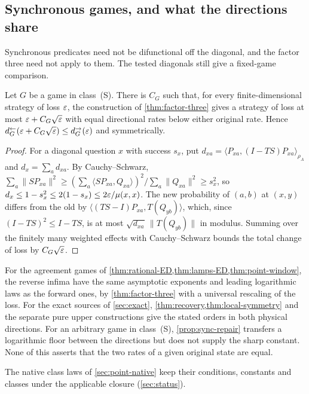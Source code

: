 \subsection{Synchronous games, and what the directions share}\label{sec:direction-sync}

Synchronous predicates need not be difunctional off the diagonal, and the factor three need not apply to them. The
tested diagonals still give a fixed-game comparison.

\begin{proposition}\label{prop:sync-repair}
Let $G$ be a game in class~(S). There is $C_G$ such that, for every finite-dimensional strategy of loss $\varepsilon$, the
construction of \cref{thm:factor-three} gives a strategy of loss at most $\varepsilon+C_G\sqrt{\varepsilon}$ with equal directional rates
below either original rate. Hence $d_G^\leftarrow(\varepsilon+C_G\sqrt{\varepsilon})\le d_G^\to(\varepsilon)$ and symmetrically.
\end{proposition}

\begin{proof}
For a diagonal question $x$ with success $s_x$, put $d_{xa}=\langle P_{xa},(I-TS)P_{xa}\rangle_{\rho_A}$ and $d_x=\sum_ad_{xa}$. By
Cauchy--Schwarz, $\sum_a\|SP_{xa}\|^2\ge(\sum_a\langle SP_{xa},Q_{xa}\rangle)^2/\sum_a\|Q_{xa}\|^2\ge s_x^2$, so
$d_x\le1-s_x^2\le2(1-s_x)\le2\varepsilon/\mu(x,x)$. The new probability of $(a,b)$ at $(x,y)$ differs from the old by
$\langle(TS-I)P_{xa},T(Q_{yb})\rangle$, which, since $(I-TS)^2\le I-TS$, is at most $\sqrt{d_{xa}}\,\|T(Q_{yb})\|$ in modulus. Summing
over the finitely many weighted effects with Cauchy--Schwarz bounds the total change of loss by $C_G\sqrt{\varepsilon}$.
\end{proof}

\begin{corollary}\label{cor:direction-spectra}
For the agreement games of \cref{thm:rational-ED,thm:lamps-ED,thm:point-window}, the reverse infima have the same
asymptotic exponents and leading logarithmic laws as the forward ones, by \cref{thm:factor-three} with a universal
rescaling of the loss. For the exact sources of \cref{sec:exact}, \cref{thm:recovery,thm:local-symmetry} and the separate
pure upper constructions give the stated orders in both physical directions. For an arbitrary game in class~(S),
\cref{prop:sync-repair} transfers a logarithmic floor between the directions but does not supply the sharp constant.
None of this asserts that the two rates of a given original state are equal.
\end{corollary}

The native class laws of \cref{sec:point-native} keep their conditions, constants and classes under the applicable
closure (\cref{sec:status}).
